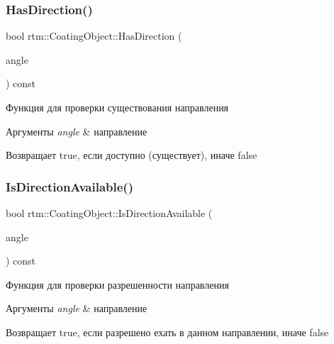 \subsubsection{\texorpdfstring{Has\+Direction()}{HasDirection()}}
{\footnotesize\ttfamily bool rtm\+::\+Coating\+Object\+::\+Has\+Direction (\begin{DoxyParamCaption}\item[{\hyperlink{namespacertm_a69dc82b16a0148c10962caa83d930f89}{Angle\+Type}}]{angle }\end{DoxyParamCaption}) const}



Функция для проверки существования направления 


\begin{DoxyParams}{Аргументы}
{\em angle} & направление \\
\hline
\end{DoxyParams}
\begin{DoxyReturn}{Возвращает}
true, если доступно (существует), иначе false 
\end{DoxyReturn}
\mbox{\label{classrtm_1_1_coating_object_a4d7656260eaa296f1bfa2e957698c437}} 
\subsubsection{\texorpdfstring{Is\+Direction\+Available()}{IsDirectionAvailable()}}
{\footnotesize\ttfamily bool rtm\+::\+Coating\+Object\+::\+Is\+Direction\+Available (\begin{DoxyParamCaption}\item[{\hyperlink{namespacertm_a69dc82b16a0148c10962caa83d930f89}{Angle\+Type}}]{angle }\end{DoxyParamCaption}) const}



Функция для проверки разрешенности направления 


\begin{DoxyParams}{Аргументы}
{\em angle} & направление \\
\hline
\end{DoxyParams}
\begin{DoxyReturn}{Возвращает}
true, если разрешено ехать в данном направлении, иначе false 
\end{DoxyReturn}
\mbox{\label{classrtm_1_1_coating_object_a93eb37a24af3939337f6330209fae809}} 
